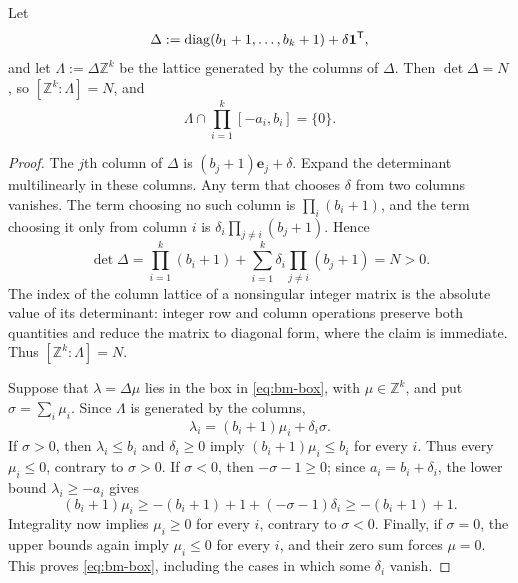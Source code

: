 \begin{lemma}\label{lem:bm-lattice}
Let
\[
\Delta:=\operatorname{diag}(b_1+1,\ldots,b_k+1)+\delta\mathbf 1^{\mathsf T},
\]
and let $\Lambda:=\Delta\mathbb Z^k$ be the lattice generated by the
columns of $\Delta$. Then $\det\Delta=N$, so $[\mathbb Z^k:\Lambda]=N$,
and
\begin{equation}\label{eq:bm-box}
\Lambda\cap\prod_{i=1}^k[-a_i,b_i]=\{0\}.
\end{equation}
\end{lemma}
\begin{proof}
The $j$th column of $\Delta$ is $(b_j+1)\mathbf e_j+\delta$. Expand the
determinant multilinearly in these columns. Any term that chooses
$\delta$ from two columns vanishes. The term choosing no such column is
$\prod_i(b_i+1)$, and the term choosing it only from column $i$ is
$\delta_i\prod_{j\ne i}(b_j+1)$. Hence
\[
\det\Delta=\prod_{i=1}^k(b_i+1)
+\sum_{i=1}^k\delta_i\prod_{j\ne i}(b_j+1)=N>0.
\]
The index of the column lattice of a nonsingular integer matrix is the
absolute value of its determinant: integer row and column operations
preserve both quantities and reduce the matrix to diagonal form, where
the claim is immediate. Thus $[\mathbb Z^k:\Lambda]=N$.

Suppose that $\lambda=\Delta\mu$ lies in the box in \eqref{eq:bm-box},
with $\mu\in\mathbb Z^k$, and put $\sigma=\sum_i\mu_i$. Since $\Lambda$
is generated by the columns,
\begin{equation}\label{eq:bm-lattice-coordinates}
\lambda_i=(b_i+1)\mu_i+\delta_i\sigma .
\end{equation}
If $\sigma>0$, then $\lambda_i\le b_i$ and $\delta_i\ge0$ imply
$(b_i+1)\mu_i\le b_i$ for every $i$. Thus every $\mu_i\le0$, contrary
to $\sigma>0$. If $\sigma<0$, then $-\sigma-1\ge0$; since
$a_i=b_i+\delta_i$, the lower bound $\lambda_i\ge-a_i$ gives
\[
(b_i+1)\mu_i\ge-(b_i+1)+1+(-\sigma-1)\delta_i\ge-(b_i+1)+1 .
\]
Integrality now implies $\mu_i\ge0$ for every $i$, contrary to
$\sigma<0$. Finally, if $\sigma=0$, the upper bounds again imply
$\mu_i\le0$ for every $i$, and their zero sum forces $\mu=0$. This
proves \eqref{eq:bm-box}, including the cases in which some $\delta_i$
vanish.
\end{proof}

